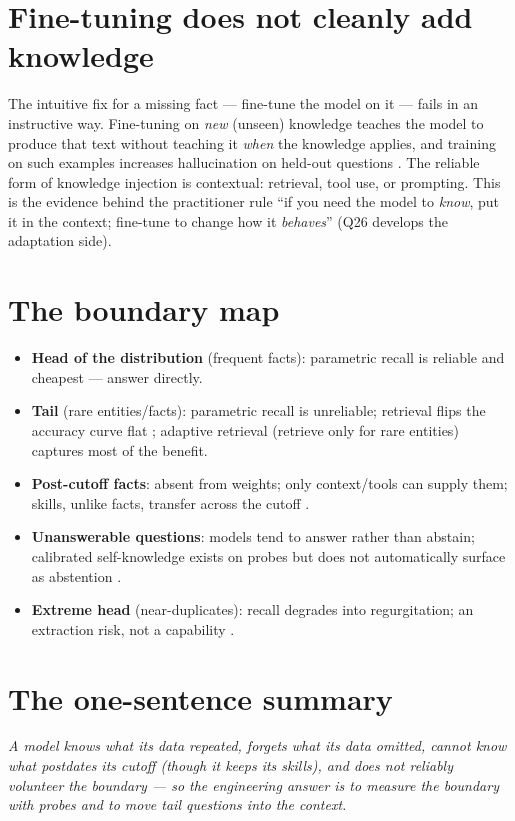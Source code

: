 \documentclass[11pt]{article}
\begin{document}
\section{Fine-tuning does not cleanly add knowledge}
The intuitive fix for a missing fact --- fine-tune the model on it --- fails in an instructive way. Fine-tuning on \emph{new} (unseen) knowledge teaches the model to produce that text without teaching it \emph{when} the knowledge applies, and training on such examples increases hallucination on held-out questions \cite{gekhman2024finetuning}. The reliable form of knowledge injection is contextual: retrieval, tool use, or prompting. This is the evidence behind the practitioner rule ``if you need the model to \emph{know}, put it in the context; fine-tune to change how it \emph{behaves}'' (Q26 develops the adaptation side).

\section{The boundary map}
\begin{itemize}[noitemsep]
  \item \textbf{Head of the distribution} (frequent facts): parametric recall is reliable and cheapest --- answer directly.
  \item \textbf{Tail} (rare entities/facts): parametric recall is unreliable; retrieval flips the accuracy curve flat \cite{mallen2023popqa}; adaptive retrieval (retrieve only for rare entities) captures most of the benefit.
  \item \textbf{Post-cutoff facts}: absent from weights; only context/tools can supply them; skills, unlike facts, transfer across the cutoff \cite{lazaridou2021mindgap}.
  \item \textbf{Unanswerable questions}: models tend to answer rather than abstain; calibrated self-knowledge exists on probes but does not automatically surface as abstention \cite{yin2023dontknow}.
  \item \textbf{Extreme head} (near-duplicates): recall degrades into regurgitation; an extraction risk, not a capability \cite{carlini2021extracting}.
\end{itemize}

\section*{The one-sentence summary}
\emph{A model knows what its data repeated, forgets what its data omitted, cannot know what postdates its cutoff (though it keeps its skills), and does not reliably volunteer the boundary --- so the engineering answer is to measure the boundary with probes and to move tail questions into the context.}



\end{document}
